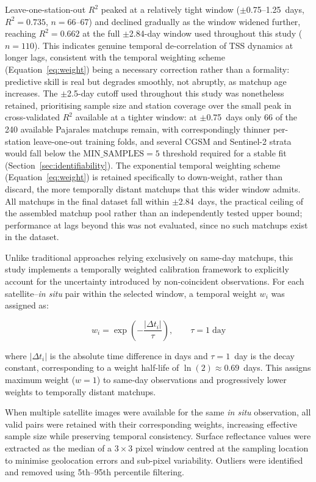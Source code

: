 \documentclass[remotesensing,article,submit,pdftex,moreauthors]{Definitions/mdpi}
\begin{document}
Leave-one-station-out $R^2$ peaked at a relatively tight window
($\pm$0.75--1.25~days, $R^2 = 0.735$, $n = 66$--67) and declined
gradually as the window widened further, reaching $R^2 = 0.662$ at the
full $\pm$2.84-day window used throughout this study ($n = 110$). This
indicates genuine temporal de-correlation of TSS dynamics at longer
lags, consistent with the temporal weighting scheme
(Equation~\ref{eq:weight}) being a necessary correction rather than a
formality: predictive skill is real but degrades smoothly, not
abruptly, as matchup age increases. The $\pm$2.5-day cutoff used
throughout this study was nonetheless retained, prioritising sample
size and station coverage over the small peak in cross-validated
$R^2$ available at a tighter window: at $\pm$0.75~days only 66 of the
240 available Pajarales matchups remain, with correspondingly thinner
per-station leave-one-out training folds, and several CGSM and
Sentinel-2 strata would fall below the $\text{MIN\_SAMPLES} = 5$
threshold required for a stable fit (Section~\ref{sec:identifiability}).
The exponential temporal weighting scheme (Equation~\ref{eq:weight})
is retained specifically to down-weight, rather than discard, the
more temporally distant matchups that this wider window admits. All
matchups in the final dataset fall within $\pm$2.84~days, the
practical ceiling of the assembled matchup pool rather than an
independently tested upper bound; performance at lags beyond this was
not evaluated, since no such matchups exist in the dataset.
 
Unlike traditional approaches relying exclusively on same-day matchups, this study implements a temporally weighted calibration framework to
explicitly account for the uncertainty introduced by non-coincident
observations. For each satellite--\textit{in situ} pair within the
selected window, a temporal weight $w_i$ was assigned as:
 
\begin{equation}
w_i = \exp\!\left(-\frac{|\Delta t_i|}{\tau}\right), \qquad \tau = 1\;\text{day}
\label{eq:weight}
\end{equation}
 
where $|\Delta t_i|$ is the absolute time difference in days and
$\tau = 1$~day is the decay constant, corresponding to a weight
half-life of $\ln(2) \approx 0.69$~days. This assigns maximum weight
($w = 1$) to same-day observations and progressively lower weights to
temporally distant matchups.

When multiple satellite images were available for the same
\textit{in situ} observation, all valid pairs were retained with their
corresponding weights, increasing effective sample size while preserving
temporal consistency. Surface reflectance values were extracted as the
median of a $3 \times 3$ pixel window
centred at the sampling location to minimise geolocation errors and sub-pixel variability. Outliers were
identified and removed using 5th--95th percentile filtering.
 
\end{document}
